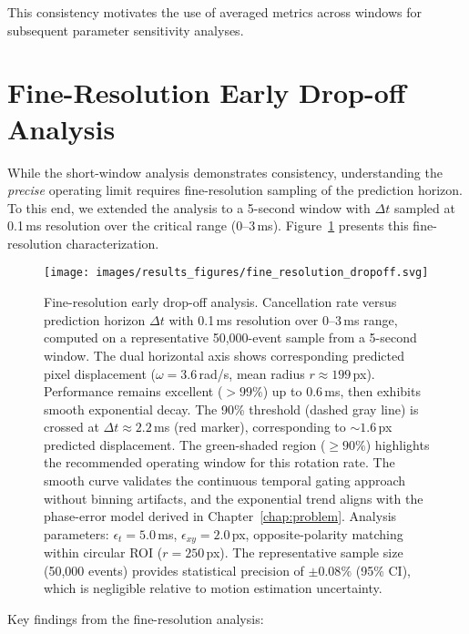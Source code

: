 This consistency motivates the use of averaged metrics across windows for subsequent parameter sensitivity analyses.


\section{Fine-Resolution Early Drop-off Analysis}

While the short-window analysis demonstrates consistency, understanding the \emph{precise} operating limit requires fine-resolution sampling of the prediction horizon. To this end, we extended the analysis to a 5-second window with $\Delta t$ sampled at 0.1\,ms resolution over the critical range (0--3\,ms). Figure~\ref{fig:fine_dropoff} presents this fine-resolution characterization.

\begin{figure}[t]
  \centering
  \texttt{[image: images/results\_figures/fine\_resolution\_dropoff.svg]}
  \caption{Fine-resolution early drop-off analysis. Cancellation rate versus prediction horizon $\Delta t$ with 0.1\,ms resolution over 0--3\,ms range, computed on a representative 50,000-event sample from a 5-second window. The dual horizontal axis shows corresponding predicted pixel displacement ($\omega=3.6$\,rad/s, mean radius $r\approx 199$\,px). Performance remains excellent ($>99\%$) up to 0.6\,ms, then exhibits smooth exponential decay. The 90\% threshold (dashed gray line) is crossed at $\Delta t \approx 2.2$\,ms (red marker), corresponding to $\sim 1.6$\,px predicted displacement. The green-shaded region ($\geq 90\%$) highlights the recommended operating window for this rotation rate. The smooth curve validates the continuous temporal gating approach without binning artifacts, and the exponential trend aligns with the phase-error model derived in Chapter~\ref{chap:problem}. Analysis parameters: $\epsilon_t=5.0$\,ms, $\epsilon_{xy}=2.0$\,px, opposite-polarity matching within circular ROI ($r=250$\,px). The representative sample size (50,000 events) provides statistical precision of $\pm 0.08\%$ (95\% CI), which is negligible relative to motion estimation uncertainty.}
  \label{fig:fine_dropoff}
\end{figure}

Key findings from the fine-resolution analysis:

